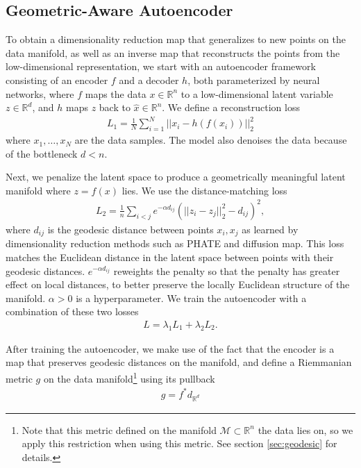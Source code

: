 \documentclass{article}
\theoremstyle{plain}
\theoremstyle{definition}
\theoremstyle{remark}
\begin{document}
\subsection{Geometric-Aware Autoencoder}\label{sec:ae}
\par To obtain a dimensionality reduction map that generalizes to new points on the data manifold, as well as an inverse map that reconstructs the points from the low-dimensional representation, we start with an autoencoder framework consisting of an encoder $f$ and a decoder $h$, both parameterized by neural networks, where $f$ maps the data $x\in\mathbb R^n$ to a low-dimensional latent variable $z\in\mathbb R^d$, and $h$ maps $z$ back to $\hat x\in\mathbb R^n$. We define a reconstruction loss 
\begin{align}
    L_1=\frac{1}{N}\sum_{i=1}^N||x_i-h(f(x_i))||_2^2
\end{align}
where $x_1,\dots,x_N$ are the data samples. The model also denoises the data because of the bottleneck $d<n$. 
\par Next, we penalize the latent space to produce a geometrically meaningful latent manifold where $z=f(x)$ lies. We use the distance-matching loss
\begin{align}
    L_2=\frac{1}{n}\sum_{i<j}e^{-\alpha d_{ij}}\left(||z_i-z_j||^2_2-d_{ij}\right)^2,
\end{align}
where $d_{ij}$ is the geodesic distance between points $x_i,x_j$ as learned by dimensionality reduction methods such as PHATE and diffusion map. This loss matches the Euclidean distance in the latent space between points with their geodesic distances. $e^{-\alpha d_{ij}}$ reweights the penalty so that the penalty has greater effect on local distances, to better preserve the locally Euclidean structure of the manifold. $\alpha>0$ is a hyperparameter. We train the autoencoder with a combination of these two losses
\begin{align}
    L=\lambda_1L_1+\lambda_2L_2.
\end{align}
\par After training the autoencoder, we make use of the fact that the encoder is a map that preserves geodesic distances on the manifold, and define a Riemmanian metric $g$ on the data manifold\footnote{Note that this metric defined on the manifold $\mathcal M\subset \mathbb R^n$ the data lies on, so we apply this restriction when using this metric. See section \ref{sec:geodesic} for details.} using its pullback
\begin{align}
    g=f^*d_{\mathbb R^d}
\end{align}
\end{document}

